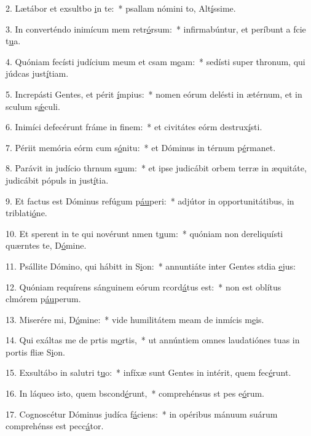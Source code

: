 2. Lætábor et exsultbo \uline{i}n te:~* psallam nómini to, Alt\uline{í}ssime.\par 
3. In converténdo inimícum mem retr\uline{ó}rsum:~* infirmabúntur, et períbunt a fcie t\uline{u}a.\par 
4. Quóniam fecísti judícium meum et csam m\uline{e}am:~* sedísti super thronum, qui júdcas just\uline{í}tiam.\par 
5. Increpásti Gentes, et périt \uline{í}mpius:~* nomen eórum delésti in ætérnum, et in sculum s\uline{ǽ}culi.\par 
6. Inimíci defecérunt fráme in f\uline{i}nem:~* et civitátes eórm destrux\uline{í}sti.\par 
7. Périit memória eórm cum s\uline{ó}nitu:~* et Dóminus in térnum p\uline{é}rmanet.\par 
8. Parávit in judício thrnum s\uline{u}um:~* et ipse judicábit orbem terræ in æquitáte, judicábit pópuls in just\uline{í}tia.\par 
9. Et factus est Dóminus refúgum p\uline{áu}peri:~* adjútor in opportunitátibus, in triblati\uline{ó}ne.\par 
10. Et sperent in te qui novérunt nmen t\uline{u}um:~* quóniam non dereliquísti quærntes te, D\uline{ó}mine.\par 
11. Psállite Dómino, qui hábitt in S\uline{i}on:~* annuntiáte inter Gentes stdia \uline{e}jus:\par 
12. Quóniam requírens sánguinem eórum rcord\uline{á}tus est:~* non est oblítus clmórem p\uline{áu}perum.\par 
13. Miserére mi, D\uline{ó}mine:~* vide humilitátem meam de inmícis m\uline{e}is.\par 
14. Qui exáltas me de prtis m\uline{o}rtis,~* ut annúntiem omnes laudatiónes tuas in portis fliæ S\uline{i}on.\par 
15. Exsultábo in salutri t\uline{u}o:~* infíxæ sunt Gentes in intérit, quem fec\uline{é}runt.\par 
16. In láqueo isto, quem bscond\uline{é}runt,~* comprehénsus st pes e\uline{ó}rum.\par 
17. Cognoscétur Dóminus judíca f\uline{á}ciens:~* in opéribus mánuum suárum comprehénss est pecc\uline{á}tor.\par 
